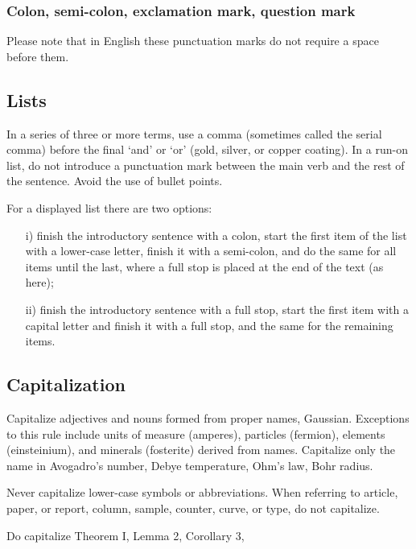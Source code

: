 \documentclass{cernrep}
\begin{document}
\subsubsection{Colon, semi-colon, exclamation mark, question mark}

Please note that in English these punctuation marks do not require a
space before them.

\subsection{Lists}

In a series of three or more terms, use a comma (sometimes called the
serial comma) before the final `and' or `or' (\eg gold, silver, or
copper coating). In a run-on list, do not introduce a punctuation mark
between the main verb and the rest of the sentence.  Avoid the use of
bullet points.

For a displayed list there are two options:

\begin{itemize}
\item[i)]  finish the introductory sentence with a colon, start the
           first item of the list with a lower-case letter, finish it
           with a semi-colon, and do the same for all items until the
           last, where a full stop is placed at the end of the text
           (as here);
\item[ii)] finish the introductory sentence with a full stop, start
           the first item with a capital letter and finish it with a
           full stop, and the same for the remaining items.
\end{itemize}

\subsection{Capitalization}

Capitalize adjectives and nouns formed from proper names,
\eg Gaussian.  Exceptions to this rule include units of measure
(amperes), particles (fermion), elements (einsteinium), and minerals
(fosterite) derived from names.  Capitalize only the name in
Avogadro's number, Debye temperature, Ohm's law, Bohr radius.

Never capitalize lower-case symbols or abbreviations. When referring
to article, paper, or report, column, sample, counter, curve, or type,
do not capitalize.

Do capitalize Theorem I, Lemma 2, Corollary 3, \etc
\end{document}

